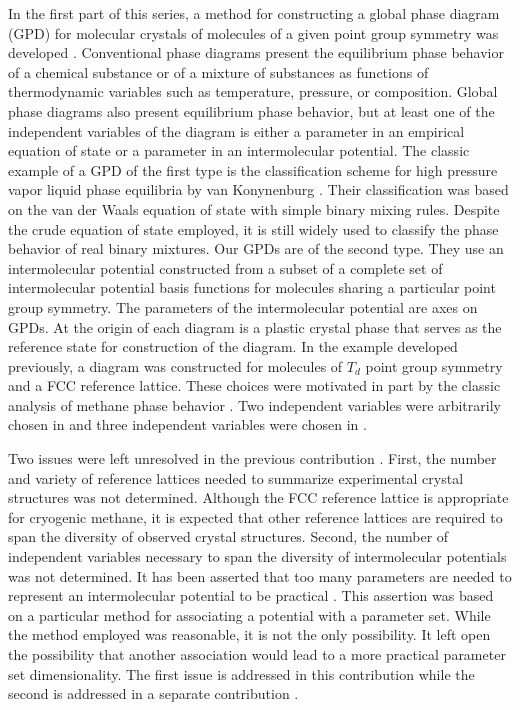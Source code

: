 \documentclass[preprint]{iucr}              %
\begin{document}
In the first part of this series, a method for constructing a global phase diagram (GPD) for molecular crystals of molecules of a given point group symmetry was developed \cite{Mettes04}.  Conventional phase diagrams present the equilibrium phase behavior of a chemical substance or of a mixture of substances as functions of thermodynamic variables such as temperature, pressure, or composition.  Global phase diagrams also present equilibrium phase behavior, but at least one of the independent variables of the diagram is either a parameter in an empirical equation of state or a parameter in an intermolecular potential.  The classic example of a GPD of the first type is the classification scheme for high pressure vapor liquid phase equilibria by van Konynenburg \cite{VanKonynenburg80}. Their classification was based on the van der Waals equation of state with simple binary mixing rules. Despite the crude equation of state employed, it is still widely used to classify the phase behavior of real binary mixtures.  Our GPDs are of the second type. They use an intermolecular potential constructed from a subset of a complete set of intermolecular potential basis functions for molecules sharing a particular point group symmetry.  The parameters of the intermolecular potential are axes on GPDs.  At the origin of each diagram is a plastic crystal phase that serves as the reference state for construction of the diagram.  In the example developed previously, \cite{Keith04c,Mettes04} a diagram was constructed for molecules of $T_d$ point group symmetry and a FCC reference lattice.  These choices were motivated in part by the classic analysis of methane phase behavior \cite{James59}.  Two independent variables were arbitrarily chosen in \cite{Keith04c} and three independent variables were chosen in \cite{Mettes04}.  

Two issues were left unresolved in the previous contribution \cite{Mettes04}.  First, the number and variety of reference lattices needed to summarize experimental crystal structures was not determined.  Although the FCC reference lattice is appropriate for cryogenic methane, it is expected that other reference lattices are required to span the diversity of observed crystal structures.  Second, the number of independent variables necessary to span the diversity of intermolecular potentials was not determined.  It has been asserted that too many parameters are needed to represent an intermolecular potential to be practical \cite{Briels80}.  This assertion was based on a particular method for associating a potential with a parameter set.  While the method employed was reasonable, it is not the only possibility.  It left open the possibility that another association would lead to a more practical parameter set dimensionality.  The first issue is addressed in this contribution while the second is addressed in a separate contribution \cite{Keith09}.
\end{document}
